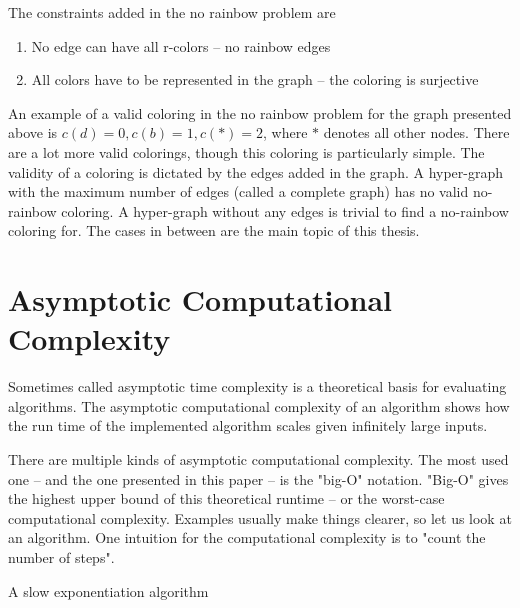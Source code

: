 \documentclass[msc,lith,english]{liuthesis}
\begin{document}
The constraints added in the no rainbow problem are
\begin{enumerate}
  \item No edge can have all r-colors -- no rainbow edges
  \item All colors have to be represented in the graph -- the coloring is surjective
\end{enumerate}

An example of a valid coloring in the no rainbow problem for the graph presented above is $c(d)=0, c(b)=1, c(*)=2$, where $*$ denotes all other nodes.
There are a lot more valid colorings, though this coloring is particularly simple.
The validity of a coloring is dictated by the edges added in the graph.
A hyper-graph with the maximum number of edges (called a complete graph) has no valid no-rainbow coloring.
A hyper-graph without any edges is trivial to find a no-rainbow coloring for.
The cases in between are the main topic of this thesis.

\cite{sourceHyper}

\section{Asymptotic Computational Complexity}
Sometimes called asymptotic time complexity is a theoretical basis for evaluating algorithms.
The asymptotic computational complexity of an algorithm shows how the run time
of the implemented algorithm scales given infinitely large inputs.

There are multiple kinds of asymptotic computational complexity. The most used
one -- and the one presented in this paper -- is the "big-O" notation. "Big-O"
gives the highest upper bound of this theoretical runtime -- or the worst-case
computational complexity. Examples usually make things clearer, so let us look at an algorithm.
One intuition for the computational complexity is to "count the number of steps".

\begin{algorithm}
\caption{A slow exponentiation algorithm}\label{algDivSlow}
\DontPrintSemicolon
{}

\end{algorithm}
\end{document}
